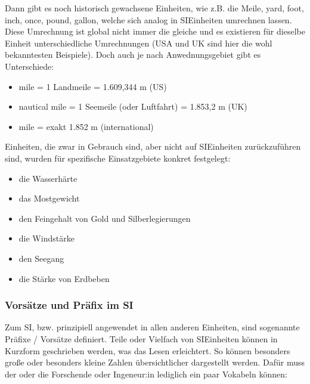 \documentclass[letterpaper,10pt,english]{jupyterBook}
\begin{document}
\sphinxAtStartPar
Dann gibt es noch historisch gewachsene Einheiten, wie z.B. die Meile, yard, foot, inch, once, pound, gallon, welche sich analog in SI\sphinxhyphen{}Einheiten umrechnen lassen. Diese Umrechnung ist global nicht immer die gleiche und es existieren für dieselbe Einheit unterschiedliche Umrechnungen (USA und UK sind hier die wohl bekanntesten Beispiele). Doch auch je nach Anwednungsgebiet gibt es Unterschiede:
\begin{itemize}
\item {} 
 mile = 1 Landmeile = 1.609,344 m (US)

\item {} 
 nautical mile = 1 Seemeile (oder Luftfahrt) = 1.853,2 m (UK)

\item {} 
 mile = exakt 1.852 m (international)

\end{itemize}

\sphinxAtStartPar
Einheiten, die zwar in Gebrauch sind, aber nicht auf SI\sphinxhyphen{}Einheiten zurückzuführen sind, wurden für spezifische Einsatzgebiete konkret festgelegt:
\begin{itemize}
\item {} 
\sphinxAtStartPar
die Wasserhärte

\item {} 
\sphinxAtStartPar
das Mostgewicht

\item {} 
\sphinxAtStartPar
den Feingehalt von Gold\sphinxhyphen{} und Silberlegierungen

\item {} 
\sphinxAtStartPar
die Windstärke

\item {} 
\sphinxAtStartPar
den Seegang

\item {} 
\sphinxAtStartPar
die Stärke von Erdbeben

\end{itemize}


\subsubsection{Vorsätze und Präfix im SI}
\label{\detokenize{content/0_Basics:vorsatze-und-prafix-im-si}}
\sphinxAtStartPar
Zum SI, bzw. prinzipiell angewendet in allen anderen Einheiten, sind sogenannte Präfixe / Vorsätze definiert. Teile oder Vielfach von SI\sphinxhyphen{}Einheiten können in Kurzform geschrieben werden, was das Lesen erleichtert. So können besonders große oder besonders kleine Zahlen übersichtlicher dargestellt werden. Dafür muss der oder die Forschende oder Ingeneur:in lediglich ein paar Vokabeln können:
\end{document}
